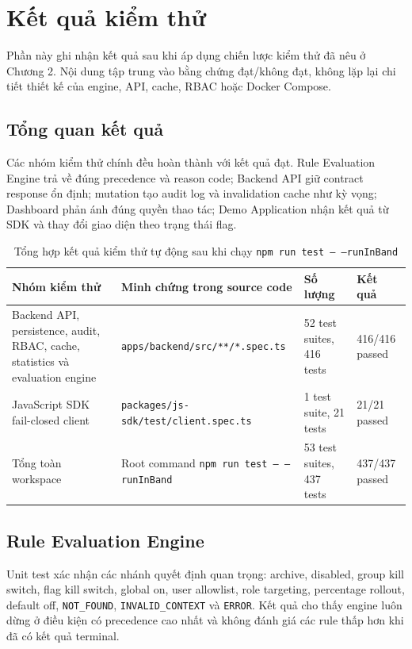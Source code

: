 \section{Kết quả kiểm thử}

Phần này ghi nhận kết quả sau khi áp dụng chiến lược kiểm thử đã nêu ở Chương 2. Nội dung tập trung vào bằng chứng đạt/không đạt, không lặp lại chi tiết thiết kế của engine, API, cache, RBAC hoặc Docker Compose.

\subsection{Tổng quan kết quả}

Các nhóm kiểm thử chính đều hoàn thành với kết quả đạt. Rule Evaluation Engine trả về đúng precedence và reason code; Backend API giữ contract response ổn định; mutation tạo audit log và invalidation cache như kỳ vọng; Dashboard phản ánh đúng quyền thao tác; Demo Application nhận kết quả từ SDK và thay đổi giao diện theo trạng thái flag.

\begin{table}[H]
    \centering
    \small
    \caption{Tổng hợp kết quả kiểm thử tự động sau khi chạy \texttt{npm run test -- --runInBand}}
    \label{tab:automated-test-summary}
    \begin{tabular}{p{} p{} p{} p{}}
        \toprule
        \textbf{Nhóm kiểm thử} & \textbf{Minh chứng trong source code} & \textbf{Số lượng} & \textbf{Kết quả} \\
        \midrule
        Backend API, persistence, audit, RBAC, cache, statistics và evaluation engine & \texttt{apps/backend/src/**/*.spec.ts} & 52 test suites, 416 tests & 416/416 passed \\
        JavaScript SDK fail-closed client & \texttt{packages/js-sdk/test/client.spec.ts} & 1 test suite, 21 tests & 21/21 passed \\
        Tổng toàn workspace & Root command \texttt{npm run test -- --runInBand} & 53 test suites, 437 tests & 437/437 passed \\
        \bottomrule
    \end{tabular}
\end{table}


\subsection{Rule Evaluation Engine}

Unit test xác nhận các nhánh quyết định quan trọng: archive, disabled, group kill switch, flag kill switch, global on, user allowlist, role targeting, percentage rollout, default off, \texttt{NOT\_FOUND}, \texttt{INVALID\_CONTEXT} và \texttt{ERROR}. Kết quả cho thấy engine luôn dừng ở điều kiện có precedence cao nhất và không đánh giá các rule thấp hơn khi đã có kết quả terminal.


